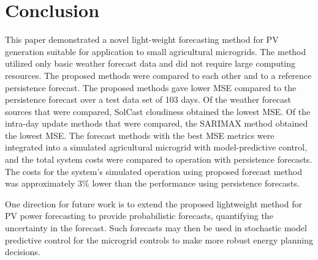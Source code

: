 \section{Conclusion}
\label{sec:conclusion}

This paper demonstrated a novel light-weight forecasting method for PV generation suitable for application to small agricultural microgrids.
The method utilized only basic weather forecast data and did not require large computing resources.
The proposed methods were compared to each other and to a reference persistence forecast.
The proposed methods gave lower MSE compared to the persistence forecast
over a test data set of
103 days.
Of the weather forecast sources that were compared,
SolCast cloudiness
obtained the lowest MSE.
Of the intra-day update methods that were compared,
the SARIMAX method
obtained the lowest MSE.
The forecast methods with the best MSE metrics were integrated into a simulated
agricultural microgrid with model-predictive control,
and the total system costs were compared to operation with persistence forecasts.
The costs for the system's simulated operation using proposed forecast method was approximately
3\% lower than the performance using persistence forecasts.

One direction for future work is to extend the proposed lightweight method for PV power forecasting to provide probabilistic forecasts, quantifying the uncertainty in the forecast.
Such forecasts may then be used in stochastic model predictive control for the microgrid controls to make more robust energy planning decisions.

